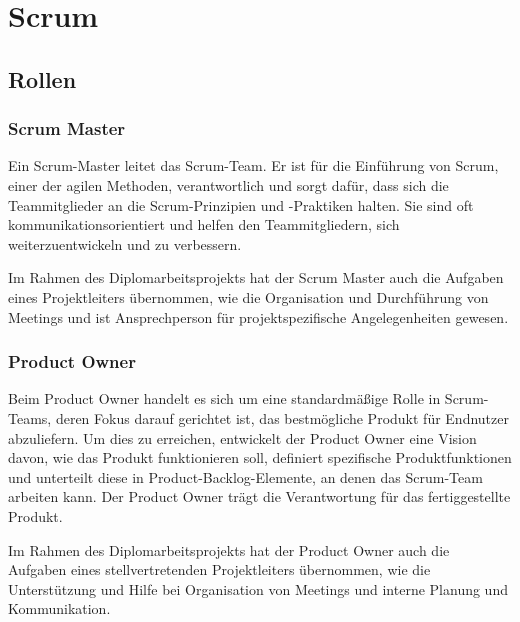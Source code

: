 
\section{Scrum}\label{sec:scrum}

\renewcommand{\kapitelautor}{Autor: Nils Hubmann} %

\subsection{Rollen}\label{subsec:rollen}

%
\subsubsection{Scrum Master}\label{subsubsec:Scrum-Master}
%

\begin{coolQuote}
Ein Scrum-Master leitet das Scrum-Team.
Er ist für die Einführung von Scrum, einer der agilen Methoden, verantwortlich und sorgt dafür, dass sich die Teammitglieder an die Scrum-Prinzipien und -Praktiken halten.
Sie sind oft kommunikationsorientiert und helfen den Teammitgliedern, sich weiterzuentwickeln und zu verbessern.
\end{coolQuote}

Im Rahmen des Diplomarbeitsprojekts hat der Scrum Master auch die Aufgaben eines Projektleiters übernommen, wie die Organisation und Durchführung von Meetings und ist Ansprechperson für projektspezifische Angelegenheiten gewesen.

%
\subsubsection{Product Owner}\label{subsubsec:Product-Owner}
%

\begin{coolQuote}
Beim Product Owner handelt es sich um eine standardmäßige Rolle in Scrum-Teams, deren Fokus darauf gerichtet ist, das bestmögliche Produkt für Endnutzer abzuliefern.
Um dies zu erreichen, entwickelt der Product Owner eine Vision davon, wie das Produkt funktionieren soll, definiert spezifische Produktfunktionen und unterteilt diese in Product-Backlog-Elemente, an denen das Scrum-Team arbeiten kann.
Der Product Owner trägt die Verantwortung für das fertiggestellte Produkt.
\end{coolQuote}

Im Rahmen des Diplomarbeitsprojekts hat der Product Owner auch die Aufgaben eines stellvertretenden Projektleiters übernommen, wie die Unterstützung und Hilfe bei Organisation von Meetings und interne Planung und Kommunikation.
%
